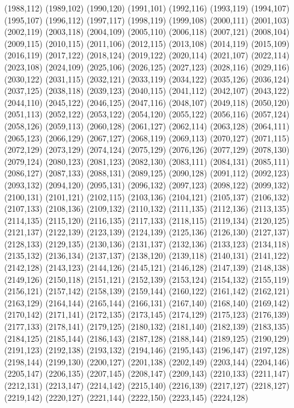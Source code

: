 (1988,112)
(1989,102)
(1990,120)
(1991,101)
(1992,116)
(1993,119)
(1994,107)
(1995,107)
(1996,112)
(1997,117)
(1998,119)
(1999,108)
(2000,111)
(2001,103)
(2002,119)
(2003,118)
(2004,109)
(2005,110)
(2006,118)
(2007,121)
(2008,104)
(2009,115)
(2010,115)
(2011,106)
(2012,115)
(2013,108)
(2014,119)
(2015,109)
(2016,119)
(2017,122)
(2018,124)
(2019,122)
(2020,114)
(2021,107)
(2022,114)
(2023,108)
(2024,109)
(2025,106)
(2026,125)
(2027,123)
(2028,116)
(2029,116)
(2030,122)
(2031,115)
(2032,121)
(2033,119)
(2034,122)
(2035,126)
(2036,124)
(2037,125)
(2038,118)
(2039,123)
(2040,115)
(2041,112)
(2042,107)
(2043,122)
(2044,110)
(2045,122)
(2046,125)
(2047,116)
(2048,107)
(2049,118)
(2050,120)
(2051,113)
(2052,122)
(2053,122)
(2054,120)
(2055,122)
(2056,116)
(2057,124)
(2058,126)
(2059,113)
(2060,128)
(2061,127)
(2062,114)
(2063,128)
(2064,111)
(2065,123)
(2066,129)
(2067,127)
(2068,119)
(2069,113)
(2070,127)
(2071,115)
(2072,129)
(2073,129)
(2074,124)
(2075,129)
(2076,126)
(2077,129)
(2078,130)
(2079,124)
(2080,123)
(2081,123)
(2082,130)
(2083,111)
(2084,131)
(2085,111)
(2086,127)
(2087,133)
(2088,131)
(2089,125)
(2090,128)
(2091,112)
(2092,123)
(2093,132)
(2094,120)
(2095,131)
(2096,132)
(2097,123)
(2098,122)
(2099,132)
(2100,131)
(2101,121)
(2102,115)
(2103,136)
(2104,121)
(2105,137)
(2106,132)
(2107,133)
(2108,136)
(2109,132)
(2110,132)
(2111,135)
(2112,136)
(2113,135)
(2114,135)
(2115,120)
(2116,135)
(2117,133)
(2118,115)
(2119,134)
(2120,125)
(2121,137)
(2122,139)
(2123,139)
(2124,139)
(2125,136)
(2126,130)
(2127,137)
(2128,133)
(2129,135)
(2130,136)
(2131,137)
(2132,136)
(2133,123)
(2134,118)
(2135,132)
(2136,134)
(2137,137)
(2138,120)
(2139,118)
(2140,131)
(2141,122)
(2142,128)
(2143,123)
(2144,126)
(2145,121)
(2146,128)
(2147,139)
(2148,138)
(2149,126)
(2150,118)
(2151,121)
(2152,139)
(2153,124)
(2154,132)
(2155,119)
(2156,121)
(2157,142)
(2158,139)
(2159,144)
(2160,122)
(2161,142)
(2162,121)
(2163,129)
(2164,144)
(2165,144)
(2166,131)
(2167,140)
(2168,140)
(2169,142)
(2170,142)
(2171,141)
(2172,135)
(2173,145)
(2174,129)
(2175,123)
(2176,139)
(2177,133)
(2178,141)
(2179,125)
(2180,132)
(2181,140)
(2182,139)
(2183,135)
(2184,125)
(2185,144)
(2186,143)
(2187,128)
(2188,144)
(2189,125)
(2190,129)
(2191,123)
(2192,138)
(2193,132)
(2194,146)
(2195,143)
(2196,147)
(2197,128)
(2198,144)
(2199,130)
(2200,127)
(2201,138)
(2202,149)
(2203,144)
(2204,146)
(2205,147)
(2206,135)
(2207,145)
(2208,147)
(2209,143)
(2210,133)
(2211,147)
(2212,131)
(2213,147)
(2214,142)
(2215,140)
(2216,139)
(2217,127)
(2218,127)
(2219,142)
(2220,127)
(2221,144)
(2222,150)
(2223,145)
(2224,128)
